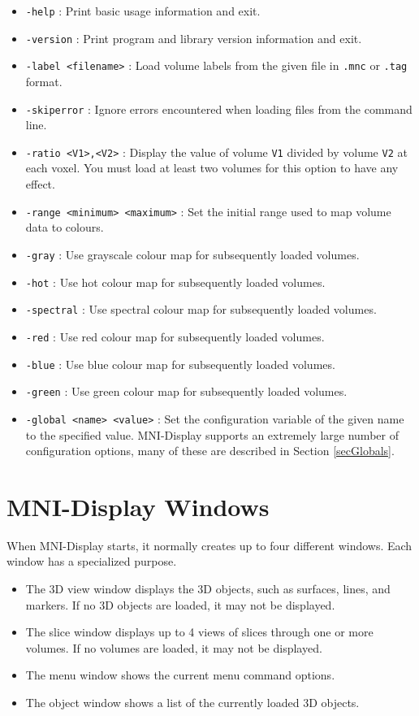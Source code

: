 \documentclass[11pt,letterpaper]{article}
\newcommand{\ident}[1]{{\tt #1}}
\newcommand{\display}{\mbox{MNI-Display}}
\begin{document}
\begin{itemize}
\item \ident{-help} : Print basic usage information and exit.
\item \ident{-version} : Print program and library version information and exit.
\item \ident{-label <filename>} : Load volume labels from the given file in \ident{.mnc} or \ident{.tag} format.
\item \ident{-skiperror} : Ignore errors encountered when loading files from the command line.
\item \ident{-ratio <V1>,<V2>} : Display the value of volume \ident{V1} divided by volume \ident{V2} at each voxel. You must load at least two volumes for this option to have any effect.
\item \ident{-range <minimum> <maximum>} : Set the initial range used to map volume data to colours.
\item \ident{-gray} : Use grayscale colour map for subsequently loaded volumes.
\item \ident{-hot} : Use hot colour map for subsequently loaded volumes.
\item \ident{-spectral} : Use spectral colour map for subsequently loaded volumes.
\item \ident{-red} : Use red colour map for subsequently loaded volumes.
\item \ident{-blue} : Use blue colour map for subsequently loaded volumes.
\item \ident{-green} : Use green colour map for subsequently loaded volumes.
\item \ident{-global <name> <value>} : Set the configuration variable of the given name to the specified value. \display{} supports an extremely large number of configuration options, many of these are described in Section \ref{secGlobals}.
\end{itemize}

\section{\display{} Windows}
When \display{} starts, it normally creates up to four different
windows. Each window has a specialized purpose.

\begin{itemize}
\item The 3D view window displays the 3D objects, such as surfaces, lines,
and markers. If no 3D objects are loaded, it may not be displayed.
\item The slice window displays up to 4 views of slices through one or more 
volumes. If no volumes are loaded, it may not be displayed.
\item The menu window shows the current menu command options.
\item The object window shows a list of the currently loaded 3D objects.
\end{itemize}
\end{document}
